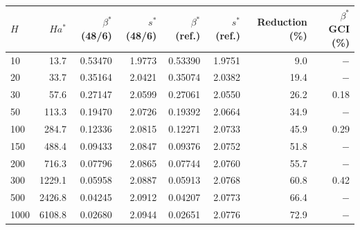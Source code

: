 \begin{tabular}{lrrrrrrr}
\toprule
$H$ & $Ha^*$ & $\beta^*$ (48/6) & $s^*$ (48/6) & $\beta^*$ (ref.) & $s^*$ (ref.) & Reduction (\%) & $\beta^*$ GCI (\%) \\
\midrule
10 & 13.7 & 0.53470 & 1.9773 & 0.53390 & 1.9751 & 9.0 & $-$ \\
20 & 33.7 & 0.35164 & 2.0421 & 0.35074 & 2.0382 & 19.4 & $-$ \\
30 & 57.6 & 0.27147 & 2.0599 & 0.27061 & 2.0550 & 26.2 & 0.18 \\
50 & 113.3 & 0.19470 & 2.0726 & 0.19392 & 2.0664 & 34.9 & $-$ \\
100 & 284.7 & 0.12336 & 2.0815 & 0.12271 & 2.0733 & 45.9 & 0.29 \\
150 & 488.4 & 0.09433 & 2.0847 & 0.09376 & 2.0752 & 51.8 & $-$ \\
200 & 716.3 & 0.07796 & 2.0865 & 0.07744 & 2.0760 & 55.7 & $-$ \\
300 & 1229.1 & 0.05958 & 2.0887 & 0.05913 & 2.0768 & 60.8 & 0.42 \\
500 & 2426.8 & 0.04245 & 2.0912 & 0.04207 & 2.0773 & 66.4 & $-$ \\
1000 & 6108.8 & 0.02680 & 2.0944 & 0.02651 & 2.0776 & 72.9 & $-$ \\
\bottomrule
\end{tabular}
